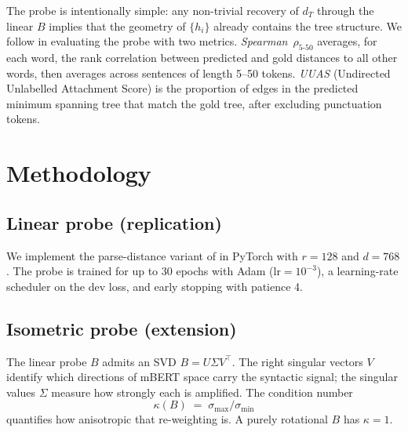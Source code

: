 \documentclass[11pt,a4paper]{article}
\begin{document}
The probe is intentionally simple: any non-trivial recovery of $d_T$
through the linear $B$ implies that the geometry of $\{h_i\}$ already
contains the tree structure. We follow \citet{hewitt2019structural}
in evaluating the probe with two metrics. \emph{Spearman~$\rho_{5\text{-}50}$}
averages, for each word, the rank correlation between predicted and
gold distances to all other words, then averages across sentences of
length 5--50 tokens. \emph{UUAS} (Undirected Unlabelled Attachment
Score) is the proportion of edges in the predicted minimum spanning
tree that match the gold tree, after excluding punctuation tokens.

\section{Methodology}
\label{sec:method}

\subsection{Linear probe (replication)}

We implement the parse-distance variant of \citet{hewitt2019structural}
in PyTorch with $r=128$ and $d=768$. The probe is trained for up to
30 epochs with Adam ($\text{lr}=10^{-3}$), a learning-rate scheduler
on the dev loss, and early stopping with patience 4.

\subsection{Isometric probe (extension)}
\label{sec:isometric}

The linear probe $B$ admits an SVD $B = U \Sigma V^\top$. The right
singular vectors $V$ identify which directions of mBERT space carry
the syntactic signal; the singular values $\Sigma$ measure how
strongly each is amplified. The condition number
\begin{equation}
  \kappa(B) \;=\; \sigma_{\max} / \sigma_{\min}
  \label{eq:cond}
\end{equation}
quantifies how anisotropic that re-weighting is. A purely rotational
$B$ has $\kappa = 1$.
\end{document}
